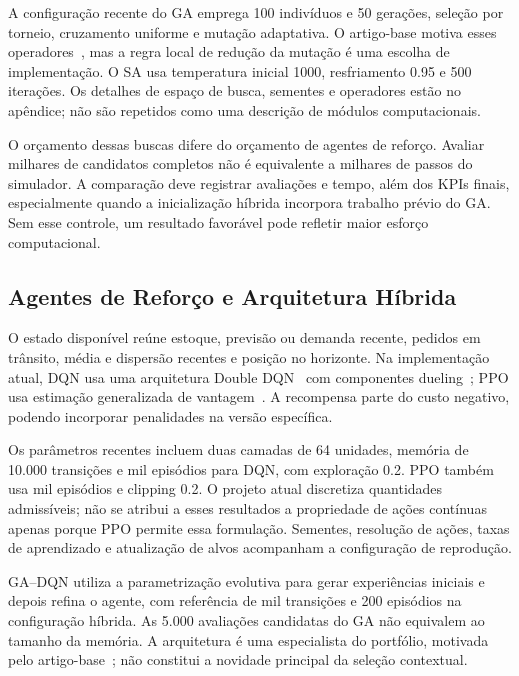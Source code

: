 A configuração recente do GA emprega 100 indivíduos e 50 gerações, seleção por torneio, cruzamento uniforme e mutação adaptativa. O artigo-base motiva esses operadores~\citep{Zabraoui2025GaDQN}, mas a regra local de redução da mutação é uma escolha de implementação. O SA usa temperatura inicial 1000, resfriamento 0.95 e 500 iterações. Os detalhes de espaço de busca, sementes e operadores estão no apêndice; não são repetidos como uma descrição de módulos computacionais.

O orçamento dessas buscas difere do orçamento de agentes de reforço. Avaliar milhares de candidatos completos não é equivalente a milhares de passos do simulador. A comparação deve registrar avaliações e tempo, além dos KPIs finais, especialmente quando a inicialização híbrida incorpora trabalho prévio do GA. Sem esse controle, um resultado favorável pode refletir maior esforço computacional.

\subsection{Agentes de Reforço e Arquitetura Híbrida}

O estado disponível reúne estoque, previsão ou demanda recente, pedidos em trânsito, média e dispersão recentes e posição no horizonte. Na implementação atual, DQN usa uma arquitetura Double DQN~\citep{VanHasselt2016DoubleDQN} com componentes dueling~\citep{Wang2016DuelingDQN}; PPO usa estimação generalizada de vantagem~\citep{Schulman2016GAE}. A recompensa parte do custo negativo, podendo incorporar penalidades na versão específica.

Os parâmetros recentes incluem duas camadas de 64 unidades, memória de 10.000 transições e mil episódios para DQN, com exploração 0.2. PPO também usa mil episódios e clipping 0.2. O projeto atual discretiza quantidades admissíveis; não se atribui a esses resultados a propriedade de ações contínuas apenas porque PPO permite essa formulação. Sementes, resolução de ações, taxas de aprendizado e atualização de alvos acompanham a configuração de reprodução.

GA--DQN utiliza a parametrização evolutiva para gerar experiências iniciais e depois refina o agente, com referência de mil transições e 200 episódios na configuração híbrida. As 5.000 avaliações candidatas do GA não equivalem ao tamanho da memória. A arquitetura é uma especialista do portfólio, motivada pelo artigo-base~\citep{Zabraoui2025GaDQN}; não constitui a novidade principal da seleção contextual.

